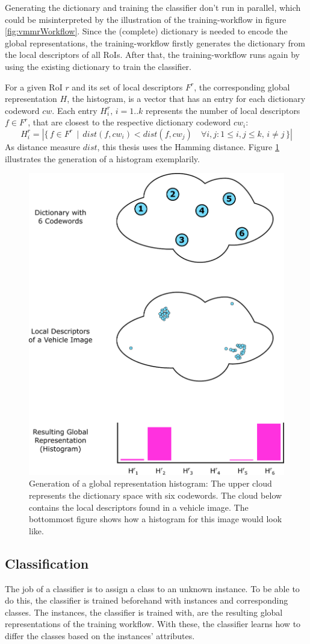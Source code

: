 Generating the dictionary and training the classifier don't run in parallel, which could be misinterpreted by the illustration of the training-workflow in figure \ref{fig:vmmrWorkflow}. Since the (complete) dictionary is needed to encode the global representations, the training-workflow firstly generates the dictionary from the local descriptors of all RoIs. After that, the training-workflow runs again by using the existing dictionary to train the classifier.

For a given RoI $r$ and its set of local descriptors $F^r$, the corresponding global representation $H$, the histogram, is a vector that has an entry for each dictionary codeword $cw$. Each entry $H_i^r,\,i = 1..k$ represents the number of local descriptors $f \in F^r$, that are closest to the respective dictionary codeword $cw_i$:
\begin{equation}
H_i^r = |\{\, f \in F^r \,\mid\, dist(f, cw_i) < dist(f, cw_j) \quad \forall i, j: 1 \le i, j \le k,\, i \ne j \,\}|
\end{equation}
As distance measure $dist$, this thesis uses the Hamming distance. Figure \ref{fig:histogram} illustrates the generation of a histogram exemplarily.

\begin{figure}[btph]
  \centering
        \includegraphics[width=.45\linewidth]{gfx/histogram}
        \caption{Generation of a global representation histogram: The upper cloud represents the dictionary space with six codewords. The cloud below contains the local descriptors found in a vehicle image. The bottommost figure shows how a histogram for this image would look like.}
        \label{fig:histogram}
\end{figure}

\subsection{Classification}\label{sec:classificationConcept}
The job of a classifier is to assign a class to an unknown instance. To be able to do this, the classifier is trained beforehand with instances and corresponding classes. The instances, the classifier is trained with, are the resulting global representations of the training workflow. With these, the classifier learns how to differ the classes based on the instances' attributes.

